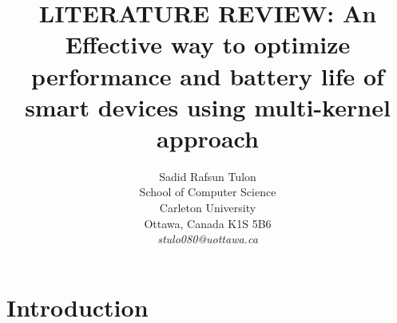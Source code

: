 \documentclass[11pt]{article}       %
\begin{document}


\title{LITERATURE REVIEW: An Effective way to optimize performance and battery life of smart devices using multi-kernel approach}


\author{
Sadid Rafsun Tulon\\
School of Computer Science\\
Carleton University\\
Ottawa, Canada K1S 5B6\\
{\em stulo080@uottawa.ca}
} %

\maketitle



\section{Introduction} \label{intro}
\end{document}
